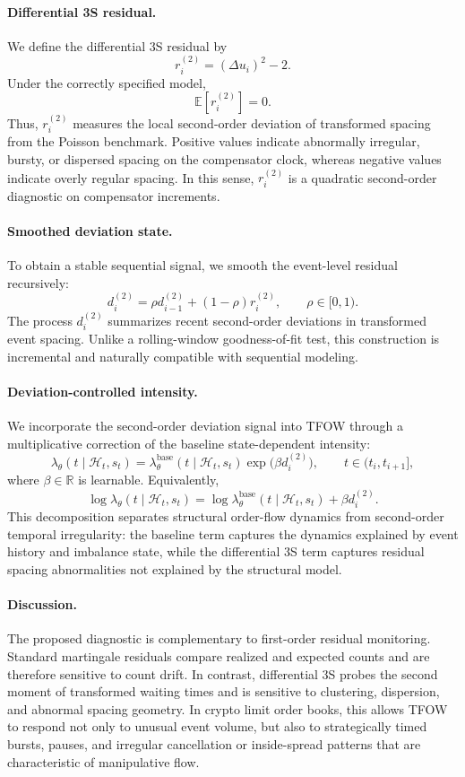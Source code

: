 \paragraph{Differential 3S residual.}
We define the differential 3S residual by
\[
r_i^{(2)}=(\Delta u_i)^2-2.
\]
Under the correctly specified model,
\[
\mathbb E[r_i^{(2)}]=0.
\]
Thus, \(r_i^{(2)}\) measures the local second-order deviation of transformed spacing from the Poisson benchmark. Positive values indicate abnormally irregular, bursty, or dispersed spacing on the compensator clock, whereas negative values indicate overly regular spacing. In this sense, \(r_i^{(2)}\) is a quadratic second-order diagnostic on compensator increments.

\paragraph{Smoothed deviation state.}
To obtain a stable sequential signal, we smooth the event-level residual recursively:
\[
d_i^{(2)}
=
\rho d_{i-1}^{(2)}+(1-\rho)r_i^{(2)},
\qquad \rho\in[0,1).
\]
The process \(d_i^{(2)}\) summarizes recent second-order deviations in transformed event spacing. Unlike a rolling-window goodness-of-fit test, this construction is incremental and naturally compatible with sequential modeling.

\paragraph{Deviation-controlled intensity.}
We incorporate the second-order deviation signal into TFOW through a multiplicative correction of the baseline state-dependent intensity:
\[
\lambda_{\theta}(t\mid \mathcal H_t,s_t)
=
\lambda_{\theta}^{\mathrm{base}}(t\mid \mathcal H_t,s_t)
\exp\!\big(\beta d_i^{(2)}\big),
\qquad t\in(t_i,t_{i+1}],
\]
where \(\beta\in\mathbb R\) is learnable. Equivalently,
\[
\log \lambda_{\theta}(t\mid \mathcal H_t,s_t)
=
\log \lambda_{\theta}^{\mathrm{base}}(t\mid \mathcal H_t,s_t)
+
\beta d_i^{(2)}.
\]
This decomposition separates structural order-flow dynamics from second-order temporal irregularity: the baseline term captures the dynamics explained by event history and imbalance state, while the differential 3S term captures residual spacing abnormalities not explained by the structural model.

\paragraph{Discussion.}
The proposed diagnostic is complementary to first-order residual monitoring. Standard martingale residuals compare realized and expected counts and are therefore sensitive to count drift. In contrast, differential 3S probes the second moment of transformed waiting times and is sensitive to clustering, dispersion, and abnormal spacing geometry. In crypto limit order books, this allows TFOW to respond not only to unusual event volume, but also to strategically timed bursts, pauses, and irregular cancellation or inside-spread patterns that are characteristic of manipulative flow.



